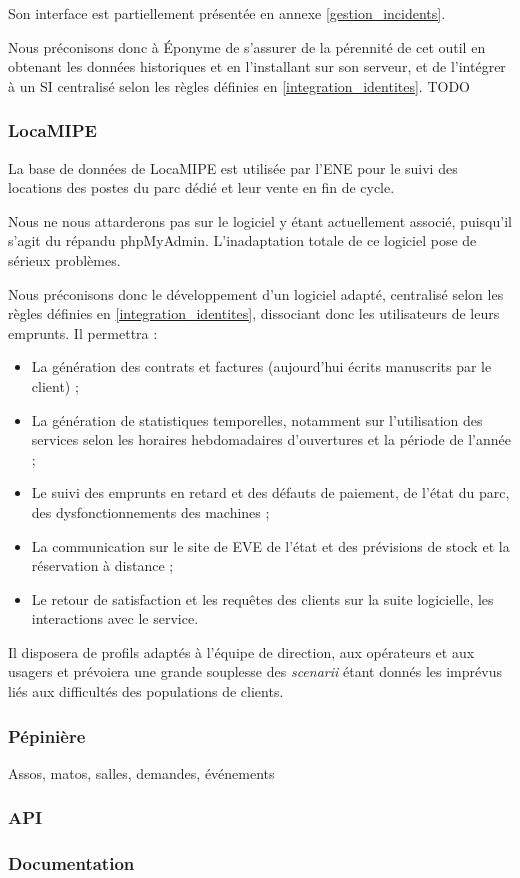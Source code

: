 Son interface est partiellement présentée en annexe \ref{gestion_incidents}.

Nous préconisons donc à Éponyme de s'assurer de la pérennité de cet outil
en obtenant les données historiques et en l'installant sur son serveur,
et de l'intégrer à un SI centralisé selon les règles définies en
\ref{integration_identites}.
TODO \label{integration_identites}

\subsubsection{LocaMIPE}

La base de données de LocaMIPE est utilisée par l'ENE pour le suivi des
locations des postes du parc dédié et leur vente en fin de cycle.

Nous ne nous attarderons pas sur le logiciel y étant actuellement associé,
puisqu'il s'agit du répandu phpMyAdmin. L'inadaptation totale de ce logiciel
pose de sérieux problèmes.

Nous préconisons donc le développement d'un logiciel adapté, centralisé selon
les règles définies en \ref{integration_identites}, dissociant donc les
utilisateurs de leurs emprunts. Il permettra :
\begin{itemize}
\item La génération des contrats et factures (aujourd'hui écrits manuscrits
      par le client) ;
\item La génération de statistiques temporelles, notamment sur l'utilisation
      des services selon les horaires hebdomadaires d'ouvertures et
      la période de l'année ;
\item Le suivi des emprunts en retard et des défauts de paiement, de l'état
      du parc, des dysfonctionnements des machines ;
\item La communication sur le site de EVE de l'état et des prévisions de
      stock et la réservation à distance ;
\item Le retour de satisfaction et les requêtes des clients sur la suite
      logicielle, les interactions avec le service.
\end{itemize}

Il disposera de profils adaptés à l'équipe de direction, aux opérateurs et
aux usagers et prévoiera une grande souplesse des \textit{scenarii} étant
donnés les imprévus liés aux difficultés des populations de clients.

\subsubsection{Pépinière}

Assos, matos, salles, demandes, événements

\subsubsection{API}

\subsubsection{Documentation}
